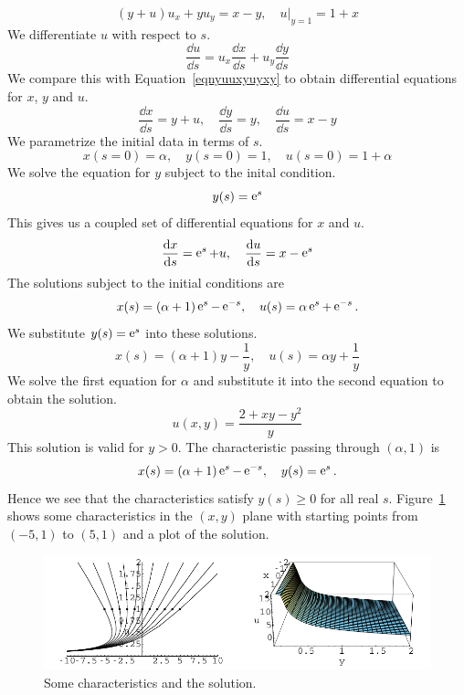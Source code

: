 {%
\begin{Solution}
  \begin{equation}
    \label{eqnyuuxyuyxy}
    (y + u) u_x + y u_y = x - y, \quad u \big|_{y=1} = 1 + x
  \end{equation}
  We differentiate $u$ with respect to $s$.
  \[
  \frac{\dd u}{\dd s} = u_x \frac{\dd x}{\dd s} + u_y \frac{\dd y}{\dd s}
  \]
  We compare this with Equation~\ref{eqnyuuxyuyxy} to obtain differential
  equations for $x$, $y$ and $u$.
  \[
  \frac{\dd x}{\dd s} = y + u, \quad
  \frac{\dd y}{\dd s} = y, \quad
  \frac{\dd u}{\dd s} = x - y
  \]
  We parametrize the initial data in terms of $s$.
  \[
  x(s = 0) = \alpha, \quad
  y(s = 0) = 1, \quad
  u(s = 0) = 1 + \alpha
  \]
  We solve the equation for $y$ subject to the inital condition.
  \[
  y(s) = \mathop{\mathrm{e}}\nolimits^s
  \]
  This gives us a coupled set of differential equations for $x$ and $u$.
  \[
  \frac{\mathrm{d} x}{\mathrm{d} s} = \mathop{\mathrm{e}}\nolimits^s + u, \quad
  \frac{\mathrm{d} u}{\mathrm{d} s} = x - \mathop{\mathrm{e}}\nolimits^s
  \]
  The solutions subject to the initial conditions are
  \[
  x(s) = (\alpha + 1) \mathop{\mathrm{e}}\nolimits^s - \mathop{\mathrm{e}}\nolimits^{-s}, \quad
  u(s) = \alpha \mathop{\mathrm{e}}\nolimits^s + \mathop{\mathrm{e}}\nolimits^{-s}.
  \]
  We substitute $y(s) = \mathop{\mathrm{e}}\nolimits^s$ into these solutions.
  \[
  x(s) = (\alpha + 1) y - \frac{1}{y}, \quad
  u(s) = \alpha y + \frac{1}{y}
  \]
  We solve the first equation for $\alpha$ and substitute it into
  the second equation to obtain the solution.
  \[
  u(x,y) = \frac{2 + x y - y^2}{y}
  \]
  This solution is valid for $y > 0$.  The characteristic passing
  through $(\alpha, 1)$ is
  \[
  x(s) = (\alpha + 1) \mathop{\mathrm{e}}\nolimits^s - \mathop{\mathrm{e}}\nolimits^{-s}, \quad
  y(s) = \mathop{\mathrm{e}}\nolimits^s.
  \]
  Hence we see that the characteristics satisfy $y(s) \geq 0$
  for all real $s$.
  Figure~\ref{charm55soln}
  shows some characteristics in the $(x,y)$ plane with starting 
  points from $(-5,1)$ to $(5,1)$ and a plot of the solution.
  \begin{figure}[h!]
    \begin{center}
      \includegraphics[width=\textwidth]{pde/characteristics/charm55soln}
    \end{center}
    \caption{Some characteristics and the solution.}
    \label{charm55soln}
  \end{figure}
\end{Solution}












\raggedbottom

}
